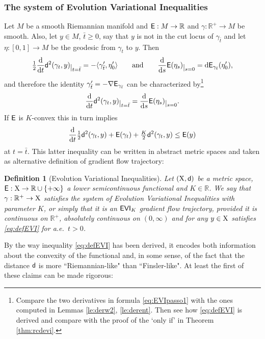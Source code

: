 \documentclass[11pt]{article}
\numberwithin{equation}{section}
\newtheorem{definition}[theorem]{Definition}
\newcommand{\R}{\mathbb{R}}
\newcommand{\restr}[1]{\lower3pt\hbox{$|_{#1}$}}
\newcommand{\X}{{\rm X}}
\newcommand{\sfd}{{\sf d}}
\renewcommand{\d}{{\rm d}}
\newcommand{\E}{{\sf E}} %
\newcommand\la{\langle}
\newcommand\ra{\rangle}
\newcommand{\EVI}{{\sf EVI}}
\begin{document}
\subsubsection{The system of Evolution Variational Inequalities}
Let $M$ be a smooth Riemannian manifold and  $\E:M\to\R$ and $\gamma:\R^+\to M$ be smooth. Also, let $y\in M$, $\bar t\geq 0$, say that $y$ is not in the cut locus of $\gamma_{\bar t}$ and let $\eta:[0,1]\to M$ be the geodesic from $\gamma_t$ to $y$. Then
\[
\begin{split}
\tfrac12\frac\d{\d t}\sfd^2(\gamma_t,y)\restr{t=\bar t}=-\la \gamma'_{\bar t},\eta'_0\ra\qquad\text{and}\qquad \frac{\d}{\d s}\E(\eta_s)\restr{s=0}=\d \E_{\gamma_{\bar t}}(\eta'_0),
\end{split}
\]
and therefore  the identity $ \gamma'_{\bar t}=-\nabla\E_{\gamma_{\bar t}}$ can be characterized by\footnote{Compare the two derivatives in formula \eqref{eq:EVIpasso1} with the ones computed in Lemmas \ref{le:derw2}, \ref{le:derent}. Then see how \eqref{eq:defEVI} is derived and compare with the proof of the `only if' in Theorem \ref{thm:rcdevi}.}
\begin{equation}
\label{eq:EVIpasso1}
\frac\d{\d t}\sfd^2(\gamma_t,y)\restr{t=\bar t}= \frac{\d}{\d s}\E(\eta_s)\restr{s=0}.
\end{equation}
If $\E$ is $K$-convex this  in turn implies
\begin{equation}
\label{eq:defEVI}
\frac{\d}{\d t}\tfrac12\sfd^2(\gamma_t,y)+\E(\gamma_{ t})+\tfrac K2\sfd^2(\gamma_{ t},y)\leq \E(y)
\end{equation}
at $t=\bar t$.
This latter inequality can be written in abstract metric spaces and taken as alternative definition of gradient flow trajectory:
\begin{definition}[Evolution Variational Inequalities]\label{def:EVI}
Let $(\X,\sfd)$ be a metric space, $\E:\X\to\R\cup\{+\infty\}$ a lower semicontinuous functional and $K\in\R$. We say that $\gamma:\R^+\to\X$ satisfies the system of Evolution Variational Inequalities with parameter $K$, or simply that it is an $\EVI_K$ gradient flow trajectory, provided it is continuous on $\R^+$, absolutely continuous on $(0,\infty)$ and for any $y\in\X$ satisfies \eqref{eq:defEVI} for a.e.\ $t>0$.
\end{definition}
By the way inequality \eqref{eq:defEVI} has been derived, it encodes both information about the convexity of the functional and, in some sense, of the fact that the distance $\sfd$ is more ``Riemannian-like" than ``Finsler-like". At least the first of these claims can  be  made rigorous:
\end{document}
